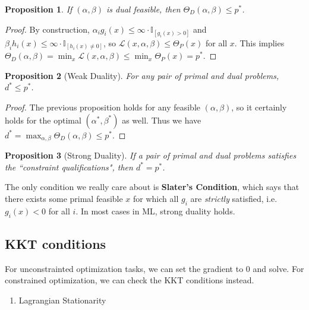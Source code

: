 \documentclass{article}
\newtheorem{prop}{Proposition}
\begin{document}
\begin{prop}
	If $(\alpha,\beta)$ is dual feasible, then $\Theta_D(\alpha,\beta) \leq p^*$.
\end{prop}
\begin{proof}
	By construction, $\alpha_i g_i(x) \leq \infty \cdot \mathbb{I}_{[g_i(x) > 0]}$ and $\beta_i h_i(x) \leq \infty\cdot\mathbb{I}_{[h_i(x) \neq 0]}$, so $\mathcal{L}(x,\alpha,\beta) \leq \Theta_P(x)$ for all $x$. This implies $\Theta_D(\alpha,\beta) = \min_x \mathcal{L}(x,\alpha,\beta) \leq \min_x \Theta_P(x) = p^*$.
\end{proof}

\begin{prop}[Weak Duality]
	For any pair of primal and dual problems, $d^* \leq p^*$.
\end{prop}
\begin{proof}
	The previous proposition holds for any feasible $(\alpha,\beta)$, so it certainly holds for the optimal $(\alpha^*, \beta^*)$ as well. Thus we have $d^* = \max_{\alpha,\beta} \Theta_D(\alpha,\beta) \leq p^*$.
\end{proof}

\begin{prop}[Strong Duality]
	If a pair of primal and dual problems satisfies the ``constraint qualifications", then $d^* = p^*$.
\end{prop}
The only condition we really care about is \textbf{Slater's Condition}, which says that there exists some primal feasible $x$ for which all $g_i$ are \textit{strictly} satisfied, i.e. $g_i(x) < 0$ for all $i$. In most cases in ML, strong duality holds.


\subsection{KKT conditions}
For unconstrainted optimization tasks, we can set the gradient to 0 and solve. For constrained optimization, we can check the KKT conditions instead.
\begin{enumerate}
	\item Lagrangian Stationarity
\end{enumerate}
\end{document}
